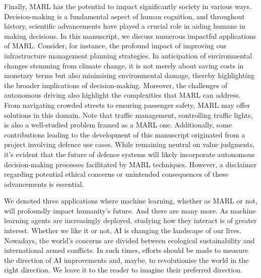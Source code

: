 Finally, MARL has the potential to impact significantly society in various ways.
Decision-making is a fundamental aspect of human cognition, and throughout history, scientific advancements have played a crucial role in aiding humans in making decisions.
In this manuscript, we discuss numerous impactful applications of MARL.
Consider, for instance, the profound impact of improving our infrastructure management planning strategies.
In anticipation of environmental changes stemming from climate change, it is not merely about saving costs in monetary terms but also minimising environmental damage, thereby highlighting the broader implications of decision-making.
Moreover, the challenges of autonomous driving also highlight the complexities that MARL can address.
From navigating crowded streets to ensuring passenger safety, MARL may offer solutions in this domain.
Note that traffic management, controlling traffic lights, is also a well-studied problem framed as a MARL one.
Additionally, some contributions leading to the development of this manuscript originated from a project involving defence use cases.
While remaining neutral on value judgments, it's evident that the future of defence systems will likely incorporate autonomous decision-making processes facilitated by MARL techniques.
However, a disclaimer regarding potential ethical concerns or unintended consequences of these advancements is essential.

We denoted three applications where machine learning, whether as MARL or not, will profoundly impact humanity's future.
And there are many more.
As machine learning agents are increasingly deployed, studying how they interact is of greater interest.
Whether we like it or not, AI is changing the landscape of our lives.
Nowadays, the world's concerns are divided between ecological sustainability and international armed conflicts.
In such times, efforts should be made to measure the direction of AI improvements and, maybe, to revolutionise the world in the right direction.
We leave it to the reader to imagine their preferred direction.